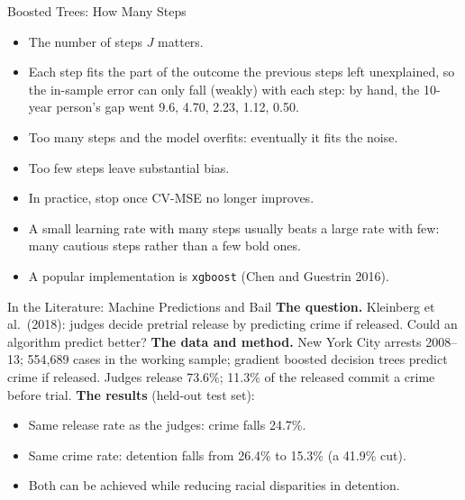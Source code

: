 \documentclass[aspectratio=169,11pt,xcolor=dvipsnames]{beamer}
\newcommand{\srcp}[1]{{\scriptsize\color{gray}(#1)}}
\begin{document}
\begin{frame}{Boosted Trees: How Many Steps}
\begin{itemize}\itemsep4pt
  \item The number of steps $J$ matters.
  \item Each step fits the part of the outcome the previous steps left
        unexplained, so the in-sample error can only fall (weakly) with each step:
        by hand, the 10-year person's gap went 9.6, 4.70, 2.23, 1.12, 0.50.
  \item Too many steps and the model overfits: eventually it fits the noise.
  \item Too few steps leave substantial bias.
  \item In practice, stop once CV-MSE no longer improves.
  \item A small learning rate with many steps usually beats a large rate with few:
        many cautious steps rather than a few bold ones.
  \item A popular implementation is \texttt{xgboost} \srcp{Chen and Guestrin 2016}.
\end{itemize}
\end{frame}

\begin{frame}{In the Literature: Machine Predictions and Bail}
\textbf{The question.} Kleinberg et al.\ (2018): judges decide pretrial release by predicting crime if
released. Could an algorithm predict better?
\vskip3pt
\textbf{The data and method.} New York City arrests 2008--13; 554,689 cases in the working
sample; \alert{gradient boosted decision trees} predict crime if released. Judges release 73.6\%; 11.3\% of the released commit a crime before trial.
\vskip3pt
\textbf{The results} (held-out test set):
\begin{itemize}\itemsep2pt
  \item Same release rate as the judges: crime falls 24.7\%.
  \item Same crime rate: detention falls from 26.4\% to 15.3\% (a 41.9\% cut).
  \item Both can be achieved while reducing racial disparities in detention.
\end{itemize}
\end{frame}
\end{document}
